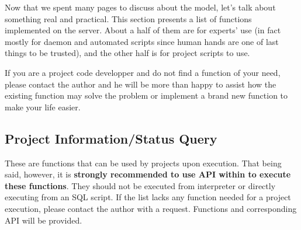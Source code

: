 
Now that we spent many pages to discuss about the {\pubs} model, let's talk
about something real and practical. This section presents a list of {\pubs} 
functions implemented on the {\psql} server. About a half of them are for
experts' use (in fact mostly for daemon and automated scripts since human
hands are one of last things to be trusted), and the other half is for
project scripts to use. 

If you are a project code developper and do not find a function of your
need, please contact the author and he will be more than happy to assist
how the existing function may solve the problem or implement a brand
new function to make your life easier.

\subsection{Project Information/Status Query}
These are functions that can be used by projects upon execution. That being
said, however, it is {\bf \color{blue} strongly recommended to use {\python} 
API within {\pubs} to execute these functions}. They should not be executed
from {\psql} interpreter or directly executing from an SQL script. If the 
list lacks any function needed for a project execution, please contact the 
author with a request. Functions and corresponding {\python} API will be 
provided.

